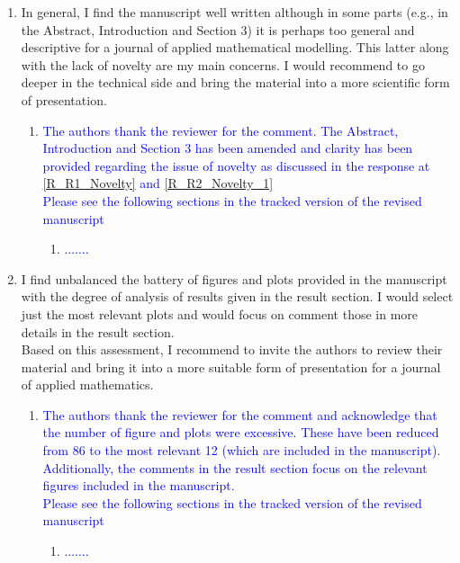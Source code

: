 \documentclass[11pt]{letter} %
\newcommand{\blue}{\textcolor{blue}}
\begin{document}
\begin{letter}
{\begin{enumerate}
\begin{enumerate}
\begin{enumerate}
\begin{enumerate}
   \end{enumerate}
        \end{enumerate}
\item \label{R_R2_TooDesc} In general, I find the manuscript well written although in some parts (e.g., in the Abstract, Introduction and Section 3) it is perhaps too general and descriptive for a journal of applied mathematical modelling. This latter along with the lack of novelty are my main concerns. I would recommend to go deeper in the technical side and bring the material into a more scientific form of presentation.
   \begin{enumerate}
   \item \label{R_R2_TooDesc_1} \blue{The authors thank the reviewer for the comment. The Abstract, Introduction and Section 3 has been amended and clarity has been provided regarding the issue of novelty as discussed in the response at \ref{R_R1_Novelty} and \ref{R_R2_Novelty_1}}\\
     \blue{Please see the following sections in the tracked version of the revised manuscript}
   \begin{enumerate}
 \item \blue{.......}
   \end{enumerate}
        \end{enumerate}
      \item \label{R_R2_TooMuchFig} I find unbalanced the battery of figures and plots provided in the manuscript with the degree of analysis of results given in the result section. I would select just the most relevant plots and would focus on comment those in more details in the result section.\\
        Based on this assessment, I recommend to invite the authors to review their material and bring it into a more suitable form of presentation for a journal of applied mathematics.
         \begin{enumerate}
         \item \label{R_R2_TooMuchFig_1} \blue{The authors thank the reviewer for the comment and acknowledge that the number of figure and plots were excessive. These have been reduced from 86 to the most relevant 12 (which are included in the manuscript). Additionally, the comments in the result section focus on the relevant figures included in the manuscript.}\\
           \blue{Please see the following sections in the tracked version of the revised manuscript}
   \begin{enumerate}
 \item \blue{.......}

\end{enumerate}
\end{enumerate}
\end{enumerate}
\end{enumerate}}
\end{letter}
\end{document}
